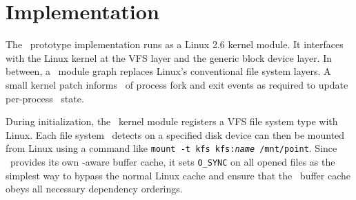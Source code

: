 \section{Implementation}
\label{sec:implementation}

The \Kudos\ prototype implementation runs as a Linux 2.6 kernel module.
%
%
It interfaces with the Linux kernel at the VFS layer and the generic block
device layer.
%
In between, a \Kudos\ module graph replaces Linux's conventional
file system layers.
%
A small kernel patch informs \Kudos\ of process fork and exit events as
required to update per-process \patchgroup\ state.


During initialization, the \Kudos\ kernel module registers a VFS file system
type with Linux.  %
%
Each file system \Kudos\ detects on a specified disk device can then be mounted
from Linux using a command like \texttt{mount -t kfs kfs:\textit{name}
/mnt/point}.
%
Since \Kudos\ provides its own \patch-aware buffer cache, it sets
\texttt{O\_SYNC} on all opened files as the simplest way to bypass the normal
Linux cache and ensure that the \Kudos\ buffer cache obeys all necessary
dependency orderings.


